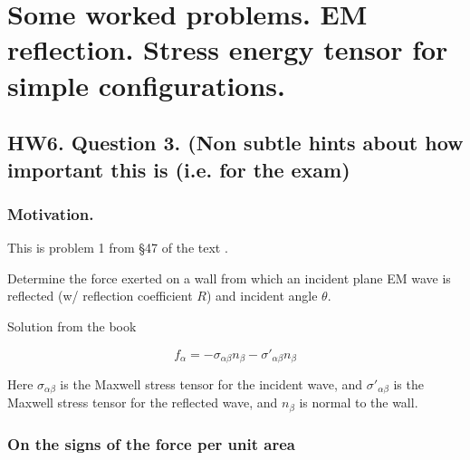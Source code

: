 %
%

\chapter{Some worked problems.  EM reflection.  Stress energy tensor for simple configurations.}
\label{chap:relativisticElectrodynamicsT9}
{}
\date{Mar 30, 2011}

\beginArtWithToc

\section{HW6. Question 3. (Non subtle hints about how important this is (i.e. for the exam)}

\subsection{Motivation.}

This is problem 1 from \S 47 of the text \cite{landau1980classical}.

Determine the force exerted on a wall from which an incident plane EM wave is reflected (w/ reflection coefficient $R$) and incident angle $\theta$.

Solution from the book

\begin{equation}\label{eqn:relativisticElectrodynamicsT9:10}
f_\alpha = - \sigma_{\alpha \beta} n_\beta - {\sigma'}_{\alpha \beta} n_\beta
\end{equation}

Here $\sigma_{\alpha \beta}$ is the Maxwell stress tensor for the incident wave, and ${\sigma'}_{\alpha \beta}$ is the Maxwell stress tensor for the reflected wave, and $n_\beta$ is normal to the wall.

\subsection{On the signs of the force per unit area}

